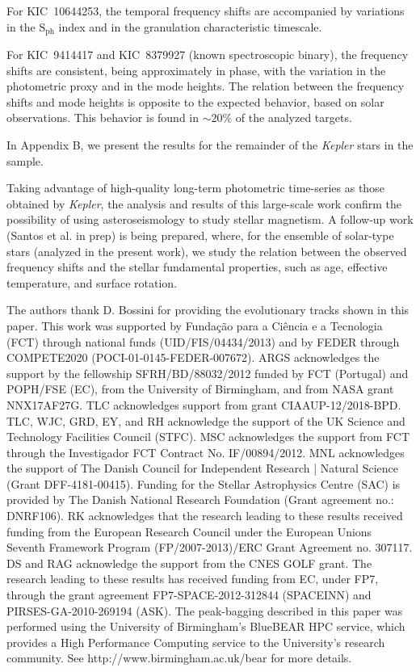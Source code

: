 \documentclass[twocolumn]{aastex61}%
\begin{document}
For KIC~10644253, the temporal frequency shifts are accompanied by variations in the $\text{S}_\text{ph}$ index and in the granulation characteristic timescale.

For KIC~9414417 and KIC~8379927 (known spectroscopic binary), the frequency shifts are consistent, being approximately in phase, with the variation in the photometric proxy and in the mode heights. The relation between the frequency shifts and mode heights is opposite to the expected behavior, based on solar observations. This behavior is found in $\sim20\%$ of the analyzed targets.

In Appendix B, we present the results for the remainder of the {\it Kepler} stars in the sample.%

Taking advantage of high-quality long-term photometric time-series as those obtained by {\it Kepler}, the analysis and results of this large-scale work confirm the possibility of using asteroseismology to study stellar magnetism. A follow-up work (Santos et al. in prep) is being prepared, where, for the ensemble of solar-type stars (analyzed in the present work), we study the relation between the observed frequency shifts and the stellar fundamental properties, such as age, effective temperature, and surface rotation.

\acknowledgments

The authors thank D. Bossini for providing the evolutionary tracks shown in this paper.
This work was supported by Funda\c{c}\~{a}o para a Ci\^{e}ncia e a Tecnologia (FCT) through national funds (UID/FIS/04434/2013) and by FEDER through COMPETE2020 (POCI-01-0145-FEDER-007672). ARGS acknowledges the support by the fellowship SFRH/BD/88032/2012 funded by FCT (Portugal) and POPH/FSE (EC), from the University of Birmingham, and from NASA grant NNX17AF27G. TLC acknowledges support from grant CIAAUP-12/2018-BPD. TLC, WJC, GRD, EY, and RH acknowledge the support of the UK Science and Technology Facilities Council (STFC). MSC acknowledges the support from FCT through the Investigador FCT Contract No. IF/00894/2012. MNL acknowledges the support of The Danish Council for Independent Research | Natural Science (Grant DFF-4181-00415). 
Funding for the Stellar Astrophysics Centre (SAC) is provided by The Danish National Research Foundation (Grant agreement no.: DNRF106). RK acknowledges that the research leading to these results received funding from the European Research Council under the European Unions Seventh Framework Program (FP/2007-2013)/ERC Grant Agreement no. 307117. DS and RAG acknowledge the support from the CNES GOLF grant.  The research leading to these results has received funding from EC, under FP7, through the grant agreement FP7-SPACE-2012-312844 (SPACEINN) and PIRSES-GA-2010-269194 (ASK). The peak-bagging described in this paper was performed using the University of Birmingham's BlueBEAR HPC service, which provides a High Performance Computing service to the University's research community. See http://www.birmingham.ac.uk/bear for more details.
\end{document}
